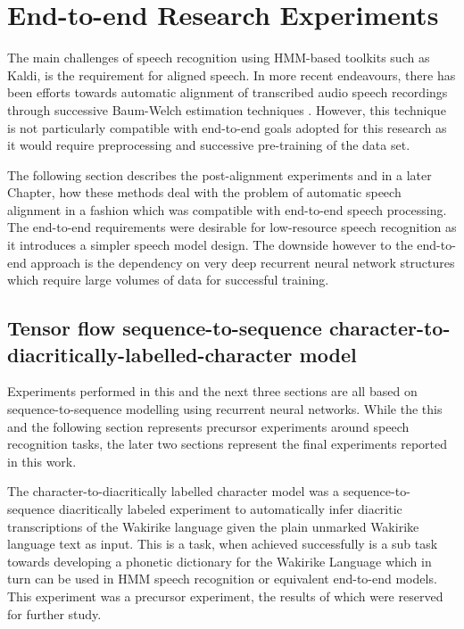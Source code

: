 \section{End-to-end Research Experiments}\label{sec_postalign}
The main challenges of speech recognition using HMM-based toolkits such as Kaldi, is the requirement for aligned speech.  In more recent endeavours, there has been efforts towards automatic alignment of transcribed audio speech recordings through successive Baum-Welch estimation techniques \cite{gales2014speech,ragni2018automatic,ragni2014data}. However, this technique is not particularly compatible with end-to-end goals adopted for this research as it would require preprocessing and successive pre-training of the data set.

The following section describes the post-alignment experiments and in a later Chapter, how these methods deal with the problem of automatic speech alignment in a fashion which was compatible with end-to-end speech processing.  The end-to-end requirements were desirable for low-resource speech recognition as it introduces a simpler speech model design.  The downside however to the end-to-end approach is the dependency on very deep recurrent neural network structures which require large volumes of data for successful training.
\subsection{Tensor flow sequence-to-sequence character-to-diacritically-labelled-character model}\label{sec_c2d}
Experiments performed in this and the next three sections are all based on sequence-to-sequence modelling using recurrent neural networks. While the this and the following section represents precursor experiments around speech recognition tasks, the later two sections represent the final experiments reported in this work.

The character-to-diacritically labelled character model was a sequence-to-sequence diacritically labeled experiment to automatically infer diacritic transcriptions of the Wakirike language given the plain unmarked Wakirike language text as input.  This is a task, when achieved successfully is a sub task towards developing a phonetic dictionary for the Wakirike Language which in turn can be used in HMM speech recognition or equivalent  end-to-end models.  This experiment was a precursor experiment, the results of which were reserved for further study.
